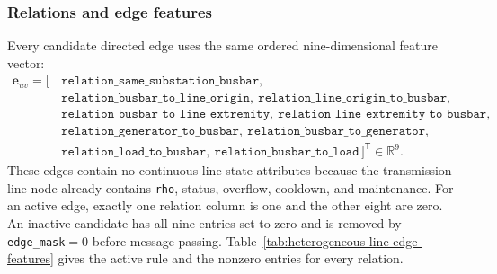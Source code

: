 \subsubsection{Relations and edge features}
\label{subsec:heterogeneous-line-relations}

Every candidate directed edge uses the same ordered nine-dimensional feature
vector:
\begin{equation}
  \begin{split}
  \mathbf{e}_{uv} = [\,&
  \texttt{relation\_same\_substation\_busbar},\\
  &\texttt{relation\_busbar\_to\_line\_origin},\
  \texttt{relation\_line\_origin\_to\_busbar},\\
  &\texttt{relation\_busbar\_to\_line\_extremity},\
  \texttt{relation\_line\_extremity\_to\_busbar},\\
  &\texttt{relation\_generator\_to\_busbar},\
  \texttt{relation\_busbar\_to\_generator},\\
  &\texttt{relation\_load\_to\_busbar},\
  \texttt{relation\_busbar\_to\_load}
  \,]^{\mathsf T}\in\mathbb{R}^{9}.
  \end{split}
  \label{eq:heterogeneous-line-common-edge-vector}
\end{equation}
These edges contain no continuous line-state attributes because the
transmission-line node already contains \texttt{rho}, status, overflow,
cooldown, and maintenance. For an active edge, exactly one relation column is
one and the other eight are zero. An inactive candidate has all nine entries set
to zero and is removed by \texttt{edge\_mask}$=0$ before message passing.
Table~\ref{tab:heterogeneous-line-edge-features} gives the active rule and the
nonzero entries for every relation.

